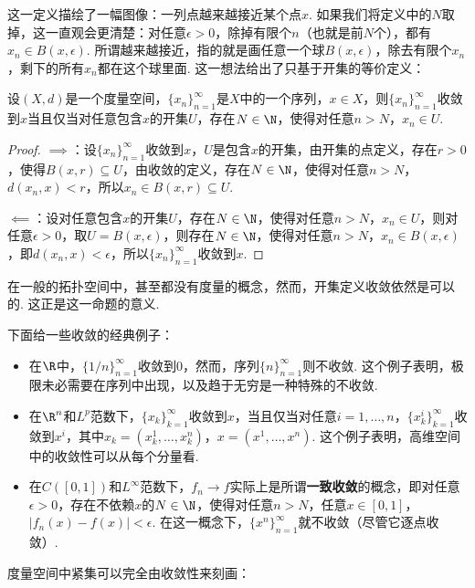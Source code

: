 这一定义描绘了一幅图像：一列点越来越接近某个点$x$. 如果我们将定义中的$N$取掉，这一直观会更清楚：对任意$\epsilon>0$，除掉有限个$n$（也就是前$N$个），都有$x_n\in B(x,\epsilon)$. 所谓越来越接近，指的就是画任意一个球$B(x,\epsilon)$，除去有限个$x_n$，剩下的所有$x_n$都在这个球里面. 这一想法给出了只基于开集的等价定义：

\begin{proposition}\label{prop:converge-ball}
    设$(X,d)$是一个度量空间，$\{x_n\}_{n=1}^\infty$是$X$中的一个序列，$x\in X$，则$\{x_n\}_{n=1}^\infty$收敛到$x$当且仅当对任意包含$x$的开集$U$，存在$N\in\N$，使得对任意$n>N$，$x_n\in U$.
\end{proposition}
\begin{proof}
    $\implies$：设$\{x_n\}_{n=1}^\infty$收敛到$x$，$U$是包含$x$的开集，由开集的点定义，存在$r>0$，使得$B(x,r)\subseteq U$，由收敛的定义，存在$N\in\N$，使得对任意$n>N$，$d(x_n,x)<r$，所以$x_n\in B(x,r)\subseteq U$.

    $\impliedby$：设对任意包含$x$的开集$U$，存在$N\in\N$，使得对任意$n>N$，$x_n\in U$，则对任意$\epsilon>0$，取$U=B(x,\epsilon)$，则存在$N\in\N$，使得对任意$n>N$，$x_n\in B(x,\epsilon)$，即$d(x_n,x)<\epsilon$，所以$\{x_n\}_{n=1}^\infty$收敛到$x$.
\end{proof}

在一般的拓扑空间中，甚至都没有度量的概念，然而，开集定义收敛依然是可以的. 这正是这一命题的意义. 

下面给一些收敛的经典例子：
\begin{example}
\begin{itemize}
    \item 在$\R$中，$\{1/n\}_{n=1}^\infty$收敛到$0$，然而，序列$\{n\}_{n=1}^\infty$则不收敛. 这个例子表明，极限未必需要在序列中出现，以及趋于无穷是一种特殊的不收敛.
    \item 在$\R^n$和$L^p$范数下，$\{x_k\}_{k=1}^\infty$收敛到$x$，当且仅当对任意$i=1,\dots,n$，$\{x_k^i\}_{k=1}^\infty$收敛到$x^i$，其中$x_k=(x_k^1,\dots,x_k^n)$，$x=(x^1,\dots,x^n)$. 这个例子表明，高维空间中的收敛性可以从每个分量看. 
    \item 在$C([0,1])$和$L^\infty$范数下，$f_n\to f$实际上是所谓\textbf{一致收敛}的概念，即对任意$\epsilon>0$，存在不依赖$x$的$N\in\N$，使得对任意$n>N$，任意$x\in[0,1]$，$|f_n(x)-f(x)|<\epsilon$. 在这一概念下，$\{x^n\}_{n=1}^\infty$就不收敛（尽管它逐点收敛）. 
\end{itemize}
\end{example}

度量空间中紧集可以完全由收敛性来刻画：

